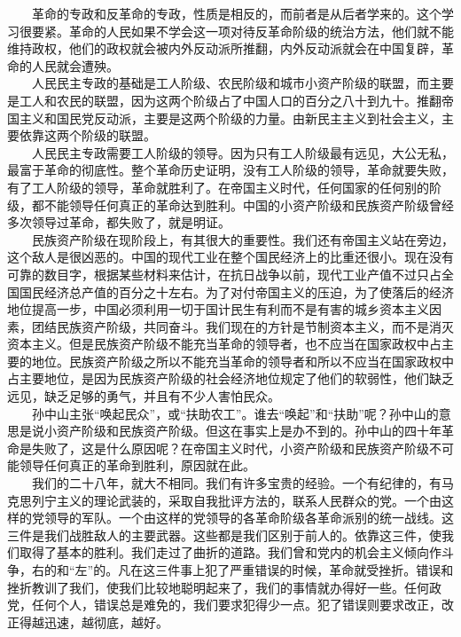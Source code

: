 \documentclass[cn,11pt,chinese]{elegantbook}
\begin{document}
　　革命的专政和反革命的专政，性质是相反的，而前者是从后者学来的。这个学习很要紧。革命的人民如果不学会这一项对待反革命阶级的统治方法，他们就不能维持政权，他们的政权就会被内外反动派所推翻，内外反动派就会在中国复辟，革命的人民就会遭殃。\\
　　人民民主专政的基础是工人阶级、农民阶级和城市小资产阶级的联盟，而主要是工人和农民的联盟，因为这两个阶级占了中国人口的百分之八十到九十。推翻帝国主义和国民党反动派，主要是这两个阶级的力量。由新民主主义到社会主义，主要依靠这两个阶级的联盟。\\
　　人民民主专政需要工人阶级的领导。因为只有工人阶级最有远见，大公无私，最富于革命的彻底性。整个革命历史证明，没有工人阶级的领导，革命就要失败，有了工人阶级的领导，革命就胜利了。在帝国主义时代，任何国家的任何别的阶级，都不能领导任何真正的革命达到胜利。中国的小资产阶级和民族资产阶级曾经多次领导过革命，都失败了，就是明证。\\
　　民族资产阶级在现阶段上，有其很大的重要性。我们还有帝国主义站在旁边，这个敌人是很凶恶的。中国的现代工业在整个国民经济上的比重还很小。现在没有可靠的数目字，根据某些材料来估计，在抗日战争以前，现代工业产值不过只占全国国民经济总产值的百分之十左右。为了对付帝国主义的压迫，为了使落后的经济地位提高一步，中国必须利用一切于国计民生有利而不是有害的城乡资本主义因素，团结民族资产阶级，共同奋斗。我们现在的方针是节制资本主义，而不是消灭资本主义。但是民族资产阶级不能充当革命的领导者，也不应当在国家政权中占主要的地位。民族资产阶级之所以不能充当革命的领导者和所以不应当在国家政权中占主要地位，是因为民族资产阶级的社会经济地位规定了他们的软弱性，他们缺乏远见，缺乏足够的勇气，并且有不少人害怕民众。\\
　　孙中山主张“唤起民众”，或“扶助农工”。谁去“唤起”和“扶助”呢？孙中山的意思是说小资产阶级和民族资产阶级。但这在事实上是办不到的。孙中山的四十年革命是失败了，这是什么原因呢？在帝国主义时代，小资产阶级和民族资产阶级不可能领导任何真正的革命到胜利，原因就在此。\\
　　我们的二十八年，就大不相同。我们有许多宝贵的经验。一个有纪律的，有马克思列宁主义的理论武装的，采取自我批评方法的，联系人民群众的党。一个由这样的党领导的军队。一个由这样的党领导的各革命阶级各革命派别的统一战线。这三件是我们战胜敌人的主要武器。这些都是我们区别于前人的。依靠这三件，使我们取得了基本的胜利。我们走过了曲折的道路。我们曾和党内的机会主义倾向作斗争，右的和“左”的。凡在这三件事上犯了严重错误的时候，革命就受挫折。错误和挫折教训了我们，使我们比较地聪明起来了，我们的事情就办得好一些。任何政党，任何个人，错误总是难免的，我们要求犯得少一点。犯了错误则要求改正，改正得越迅速，越彻底，越好。\\
\end{document}
